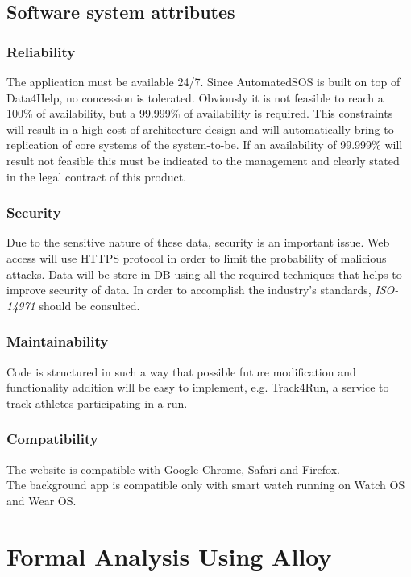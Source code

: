 \documentclass{article}
\begin{document}
\subsection{Software system attributes}
\subsubsection{Reliability}
The application must be available 24/7. Since AutomatedSOS is built on top of Data4Help, no concession is tolerated. Obviously it is not feasible to reach a 100\% of availability, but a 99.999\% of availability is required. This constraints will result in a high cost of architecture design and will automatically bring to replication of core systems of the system-to-be. If an availability of 99.999\% will result not feasible this must be indicated to the management and clearly stated in the legal contract of this product.
\subsubsection{Security}
Due to the sensitive nature of these data, security is an important issue. Web access will use HTTPS protocol in order to limit the probability of malicious attacks. Data will be store in DB using all the required techniques that helps to improve security of data. In order to accomplish the industry's standards, \emph{ISO-14971} should be consulted.
\subsubsection{Maintainability}
Code is structured in such a way that possible future modification and functionality addition will be easy to implement, e.g. Track4Run, a service to track athletes participating in a run.
\subsubsection{Compatibility}
The website is compatible with Google Chrome, Safari and Firefox. \\
The background app is compatible only with smart watch running on Watch OS and Wear OS.
\newpage
\section{Formal Analysis Using Alloy}
\end{document}
